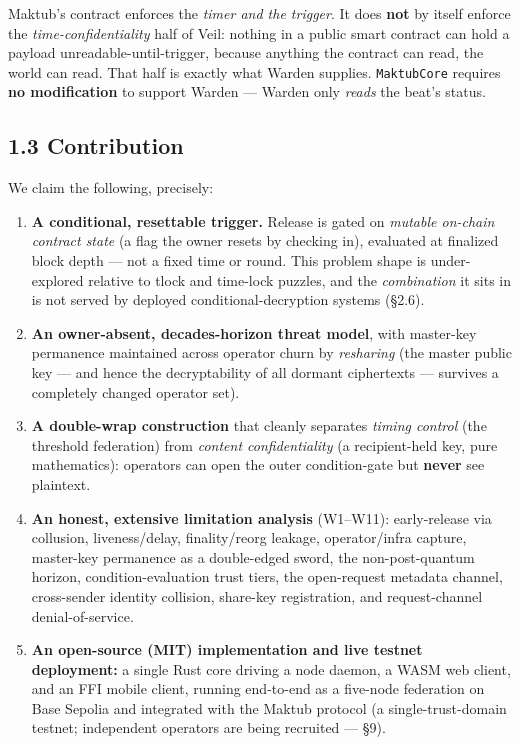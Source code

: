 \documentclass[
  11pt,
]{article}
\providecommand{\tightlist}{%
  \setlength{\itemsep}{0pt}\setlength{\parskip}{0pt}}
\begin{document}
Maktub's contract enforces the \emph{timer and the trigger}. It does
\textbf{not} by itself enforce the \emph{time-confidentiality} half of
Veil: nothing in a public smart contract can hold a payload
unreadable-until-trigger, because anything the contract can read, the
world can read. That half is exactly what Warden supplies.
\texttt{MaktubCore} requires \textbf{no modification} to support Warden
--- Warden only \emph{reads} the beat's status.

\subsection{1.3 Contribution}\label{contribution}

We claim the following, precisely:

\begin{enumerate}
\def\labelenumi{\arabic{enumi}.}
\tightlist
\item
  \textbf{A conditional, resettable trigger.} Release is gated on
  \emph{mutable on-chain contract state} (a flag the owner resets by
  checking in), evaluated at finalized block depth --- not a fixed time
  or round. This problem shape is under-explored relative to tlock and
  time-lock puzzles, and the \emph{combination} it sits in is not served
  by deployed conditional-decryption systems (§2.6).
\item
  \textbf{An owner-absent, decades-horizon threat model}, with
  master-key permanence maintained across operator churn by
  \emph{resharing} (the master public key --- and hence the
  decryptability of all dormant ciphertexts --- survives a completely
  changed operator set).
\item
  \textbf{A double-wrap construction} that cleanly separates
  \emph{timing control} (the threshold federation) from \emph{content
  confidentiality} (a recipient-held key, pure mathematics): operators
  can open the outer condition-gate but \textbf{never} see plaintext.
\item
  \textbf{An honest, extensive limitation analysis} (W1--W11):
  early-release via collusion, liveness/delay, finality/reorg leakage,
  operator/infra capture, master-key permanence as a double-edged sword,
  the non-post-quantum horizon, condition-evaluation trust tiers, the
  open-request metadata channel, cross-sender identity collision,
  share-key registration, and request-channel denial-of-service.
\item
  \textbf{An open-source (MIT) implementation and live testnet
  deployment:} a single Rust core driving a node daemon, a WASM web
  client, and an FFI mobile client, running end-to-end as a five-node
  federation on Base Sepolia and integrated with the Maktub protocol (a
  single-trust-domain testnet; independent operators are being recruited
  --- §9).
\end{enumerate}
\end{document}
